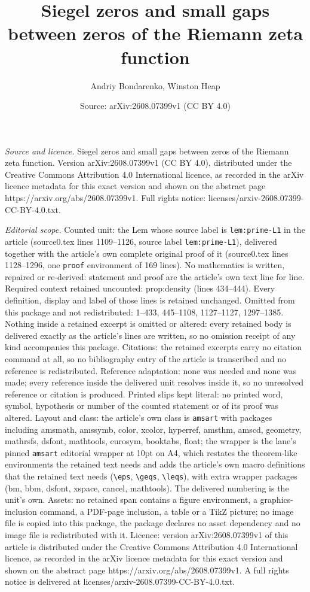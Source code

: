 \documentclass[10pt,a4paper]{amsart}
\title[Siegel zeros and small gaps between zeros of the Riemann zet]{Siegel zeros and small gaps between zeros of the Riemann zeta function}
\author{Andriy Bondarenko, Winston Heap}
\date{Source: arXiv:2608.07399v1 (CC BY 4.0)}
\begin{document}
\maketitle

\noindent\emph{Source and licence.} Siegel zeros and small gaps between zeros of the Riemann zeta function. Version arXiv:2608.07399v1 (CC BY 4.0), distributed under the Creative Commons Attribution 4.0 International licence, as recorded in the arXiv licence metadata for this exact version and shown on the abstract page https://arxiv.org/abs/2608.07399v1. Full rights notice: licenses/arxiv-2608.07399-CC-BY-4.0.txt.\par\smallskip

\noindent\textit{Editorial scope.} Counted unit: the Lem whose source label is \texttt{lem:prime-L1} in the article (source0.tex lines 1109--1126, source label \texttt{lem:prime-L1}), delivered together with the article's own complete original proof of it (source0.tex lines 1128--1296, one \texttt{proof} environment of 169 lines). No mathematics is written, repaired or re-derived: statement and proof are the article's own text line for line. Required context retained uncounted: prop:density (lines 434--444). Every definition, display and label of those lines is retained unchanged. Omitted from this package and not redistributed: 1--433, 445--1108, 1127--1127, 1297--1385. Nothing inside a retained excerpt is omitted or altered: every retained body is delivered exactly as the article's lines are written, so no omission receipt of any kind accompanies this package. Citations: the retained excerpts carry no citation command at all, so no bibliography entry of the article is transcribed and no reference is redistributed. Reference adaptation: none was needed and none was made; every reference inside the delivered unit resolves inside it, so no unresolved reference or citation is produced. Printed slips kept literal: no printed word, symbol, hypothesis or number of the counted statement or of its proof was altered. Layout and class: the article's own class is \texttt{amsart} with packages including amsmath, amssymb, color, xcolor, hyperref, amsthm, amscd, geometry, mathrsfs, dsfont, mathtools, eurosym, booktabs, float; the wrapper is the lane's pinned \texttt{amsart} editorial wrapper at 10pt on A4, which restates the theorem-like environments the retained text needs and adds the article's own macro definitions that the retained text needs (\texttt{\textbackslash eps}, \texttt{\textbackslash geqs}, \texttt{\textbackslash leqs}), with extra wrapper packages (bm, bbm, dsfont, xspace, cancel, mathtools). The delivered numbering is the unit's own. Assets: no retained span contains a figure environment, a graphics-inclusion command, a PDF-page inclusion, a table or a TikZ picture; no image file is copied into this package, the package declares no asset dependency and no image file is redistributed with it. Licence: version arXiv:2608.07399v1 of this article is distributed under the Creative Commons Attribution 4.0 International licence, as recorded in the arXiv licence metadata for this exact version and shown on the abstract page https://arxiv.org/abs/2608.07399v1. A full rights notice is delivered at licenses/arxiv-2608.07399-CC-BY-4.0.txt. 
\end{document}
